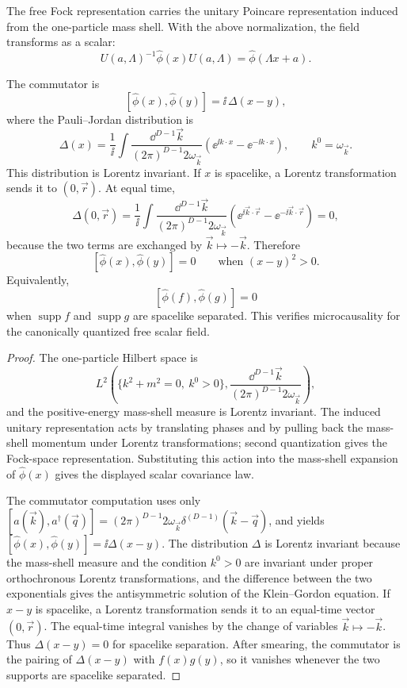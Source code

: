 \begin{proposition}
\label{prop:free-scalar-covariance-microcausality}
The free Fock representation carries the unitary Poincare representation
induced from the one-particle mass shell. With the above normalization, the
field transforms as a scalar:
\[
  U(a,\Lambda)^{-1}\widehat\phi(x)U(a,\Lambda)
  =
  \widehat\phi(\Lambda x+a).
\]

The commutator is
\[
  [\widehat\phi(x),\widehat\phi(y)]
  =
  \ii\,\Delta(x-y),
\]
where the Pauli--Jordan distribution is
\[
  \Delta(x)
  =
  \frac{1}{\ii}
  \int
  \frac{\dd^{D-1}\vec k}{(2\pi)^{D-1}2\omega_{\vec k}}
  \left(
    \ee^{\ii k\cdot x}
    -
    \ee^{-\ii k\cdot x}
  \right),
  \qquad k^0=\omega_{\vec k}.
\]
This distribution is Lorentz invariant. If \(x\) is spacelike, a Lorentz
transformation sends it to \((0,\vec r)\). At equal time,
\[
  \Delta(0,\vec r)
  =
  \frac{1}{\ii}
  \int
  \frac{\dd^{D-1}\vec k}{(2\pi)^{D-1}2\omega_{\vec k}}
  \left(
    \ee^{\ii\vec k\cdot\vec r}
    -
    \ee^{-\ii\vec k\cdot\vec r}
  \right)
  =
  0,
\]
because the two terms are exchanged by \(\vec k\mapsto-\vec k\). Therefore
\[
  [\widehat\phi(x),\widehat\phi(y)]=0
  \qquad
  \text{when }(x-y)^2>0.
\]
Equivalently,
\[
  [\widehat\phi(f),\widehat\phi(g)]=0
\]
when \(\operatorname{supp}f\) and \(\operatorname{supp}g\) are spacelike
separated. This verifies microcausality for the canonically quantized free
scalar field.
\end{proposition}

\begin{proof}
The one-particle Hilbert space is
\[
  L^2\!\left(\{k^2+m^2=0,\ k^0>0\},
  \frac{\dd^{D-1}\vec k}{(2\pi)^{D-1}2\omega_{\vec k}}\right),
\]
and the positive-energy mass-shell measure is Lorentz invariant.  The induced
unitary representation acts by translating phases and by pulling back the
mass-shell momentum under Lorentz transformations; second quantization gives
the Fock-space representation.  Substituting this action into the mass-shell
expansion of \(\widehat\phi(x)\) gives the displayed scalar covariance law.

The commutator computation uses only
\([a(\vec k),a^\dagger(\vec q)]=(2\pi)^{D-1}2\omega_{\vec k}
\delta^{(D-1)}(\vec k-\vec q)\), and yields
\([\widehat\phi(x),\widehat\phi(y)]=\ii\Delta(x-y)\).  The distribution
\(\Delta\) is Lorentz invariant because the mass-shell measure and the
condition \(k^0>0\) are invariant under proper orthochronous Lorentz
transformations, and the difference between the two exponentials gives the
antisymmetric solution of the Klein--Gordon equation.  If \(x-y\) is
spacelike, a Lorentz transformation sends it to an equal-time vector
\((0,\vec r)\).  The equal-time integral vanishes by the change of variables
\(\vec k\mapsto-\vec k\).  Thus \(\Delta(x-y)=0\) for spacelike separation.
After smearing, the commutator is the pairing of \(\Delta(x-y)\) with
\(f(x)g(y)\), so it vanishes whenever the two supports are spacelike
separated.
\end{proof}

